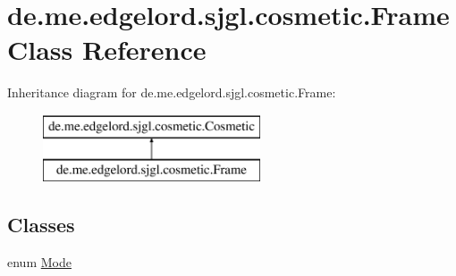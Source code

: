 \hypertarget{classde_1_1me_1_1edgelord_1_1sjgl_1_1cosmetic_1_1_frame}{}\section{de.\+me.\+edgelord.\+sjgl.\+cosmetic.\+Frame Class Reference}
\label{classde_1_1me_1_1edgelord_1_1sjgl_1_1cosmetic_1_1_frame}
Inheritance diagram for de.\+me.\+edgelord.\+sjgl.\+cosmetic.\+Frame\+:\begin{figure}[H]
\begin{center}
\leavevmode
\includegraphics[height=2.000000cm]{classde_1_1me_1_1edgelord_1_1sjgl_1_1cosmetic_1_1_frame}
\end{center}
\end{figure}
\subsection*{Classes}
\begin{DoxyCompactItemize}
\item 
enum \mbox{\hyperlink{enumde_1_1me_1_1edgelord_1_1sjgl_1_1cosmetic_1_1_frame_1_1_mode}{Mode}}
\end{DoxyCompactItemize}
